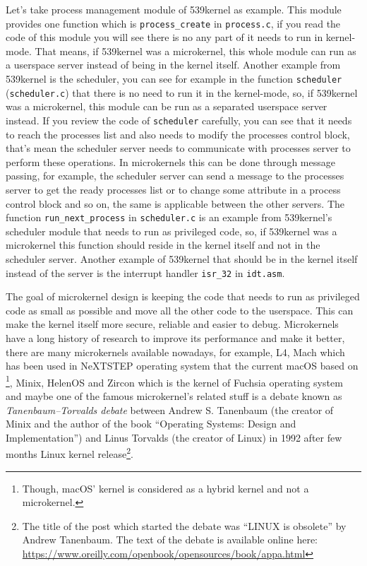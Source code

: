 Let's take process management module of 539kernel as example. This
module provides one function which is \lstinline!process_create! in
\lstinline!process.c!, if you read the code of this module you will see
there is no any part of it needs to run in kernel-mode. That means, if
539kernel was a microkernel, this whole module can run as a userspace
server instead of being in the kernel itself. Another example from
539kernel is the scheduler, you can see for example in the function
\lstinline!scheduler! (\lstinline!scheduler.c!) that there is no need to
run it in the kernel-mode, so, if 539kernel was a microkernel, this
module can be run as a separated userspace server instead. If you review
the code of \lstinline!scheduler! carefully, you can see that it needs
to reach the processes list and also needs to modify the processes
control block, that's mean the scheduler server needs to communicate
with processes server to perform these operations. In microkernels this
can be done through message passing, for example, the scheduler server
can send a message to the processes server to get the ready processes
list or to change some attribute in a process control block and so on,
the same is applicable between the other servers. The function
\lstinline!run_next_process! in \lstinline!scheduler.c! is an example
from 539kernel's scheduler module that needs to run as privileged code,
so, if 539kernel was a microkernel this function should reside in the
kernel itself and not in the scheduler server. Another example of
539kernel that should be in the kernel itself instead of the server is
the interrupt handler \lstinline!isr_32! in \lstinline!idt.asm!.

The goal of microkernel design is keeping the code that needs to run as
privileged code as small as possible and move all the other code to the
userspace. This can make the kernel itself more secure, reliable and
easier to debug. Microkernels have a long history of research to improve
its performance and make it better, there are many microkernels
available nowadays, for example, L4, Mach which has been used in
NeXTSTEP operating system that the current macOS based on \footnote{Though,
  macOS' kernel is considered as a hybrid kernel and not a microkernel.},
Minix, HelenOS and Zircon which is the kernel of Fuchsia operating
system and maybe one of the famous microkernel's related stuff is a
debate known as \emph{Tanenbaum--Torvalds debate} between Andrew S.
Tanenbaum (the creator of Minix and the author of the book ``Operating
Systems: Design and Implementation'') and Linus Torvalds (the creator of
Linux) in 1992 after few months Linux kernel release\footnote{The title
  of the post which started the debate was ``LINUX is obsolete'' by
  Andrew Tanenbaum. The text of the debate is available online here:
  \url{https://www.oreilly.com/openbook/opensources/book/appa.html}}.


